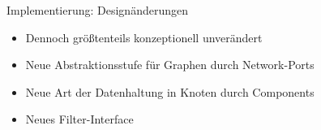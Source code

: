 \begin{frame}{Implementierung: Designänderungen}
    \begin{itemize}
      \item Dennoch größtenteils konzeptionell unverändert
      \pause
      \item Neue Abstraktionsstufe für Graphen durch Network-Ports
      \pause
      \item Neue Art der Datenhaltung in Knoten durch Components
      \pause
      \item Neues Filter-Interface
    \end{itemize}
\end{frame} 